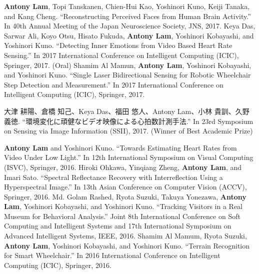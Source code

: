 \documentclass[letterpaper,10pt]{article}
\begin{document}
\textbf{Antony Lam}, Topi Tanskanen, Chien-Hui Kao, Yoshinori Kuno, Keiji Tanaka, and Kang Cheng. ``Reconstructing Perceived Faces from Human Brain Activity.'' In 40th Annual Meeting of the Japan Neuroscience Society, JNS, 2017.\vspace{0.05in}\newline
Keya Das, Sarwar Ali, Koyo Otsu, Hisato Fukuda,\textbf{ Antony Lam}, Yoshinori Kobayashi, and Yoshinori Kuno. ``Detecting Inner Emotions from Video Based Heart Rate Sensing.'' In 2017 International Conference on Intelligent Computing (ICIC), Springer, 2017. (Oral) \vspace{0.05in}\newline
Shamim Al Mamun, \textbf{Antony Lam}, Yoshinori Kobayashi, and Yoshinori Kuno. ``Single Laser Bidirectional Sensing for Robotic Wheelchair Step Detection and Measurement.'' In 2017 International Conference on Intelligent Computing (ICIC), Springer, 2017. \vspace{0.05in}\newline
\begin{CJK}{UTF8}{min}大津 耕陽、倉橋 知己、Keya Das、福田 悠人、Antony Lam、小林 貴訓、久野 義徳. ``環境変化に頑健なビデオ映像による心拍数計測手法.'' In 23rd Symposium on Sensing via Image Information (SSII), 2017. (Winner of Best Academic Prize)\end{CJK}\vspace{0.05in}\newline
\textbf{Antony Lam} and Yoshinori Kuno. ``Towards Estimating Heart Rates from Video Under Low Light.'' In 12th International Symposium on Visual Computing (ISVC), Springer, 2016. \vspace{0.05in}\newline
Hiroki Ohkawa, Yinqiang Zheng, \textbf{Antony Lam}, and Imari Sato. ``Spectral Reflectance Recovery with Interreflection Using a Hyperspectral Image.'' In 13th Asian Conference on Computer Vision (ACCV), Springer, 2016. \vspace{0.05in}\newline
Md. Golam Rashed, Ryota Suzuki, Takuya Yonezawa, \textbf{Antony Lam}, Yoshinori Kobayashi, and Yoshinori Kuno. ``Tracking Visitors in a Real Museum for Behavioral Analysis.''  Joint 8th International Conference on Soft Computing and Intelligent Systems and 17th International Symposium on Advanced Intelligent Systems, IEEE, 2016.  \vspace{0.05in}\newline
Shamim Al Mamum, Ryota Suzuki, \textbf{Antony Lam}, Yoshinori Kobayashi, and Yoshinori Kuno. ``Terrain Recognition for Smart Wheelchair.'' In 2016 International Conference on Intelligent Computing (ICIC), Springer, 2016.
\end{document}
